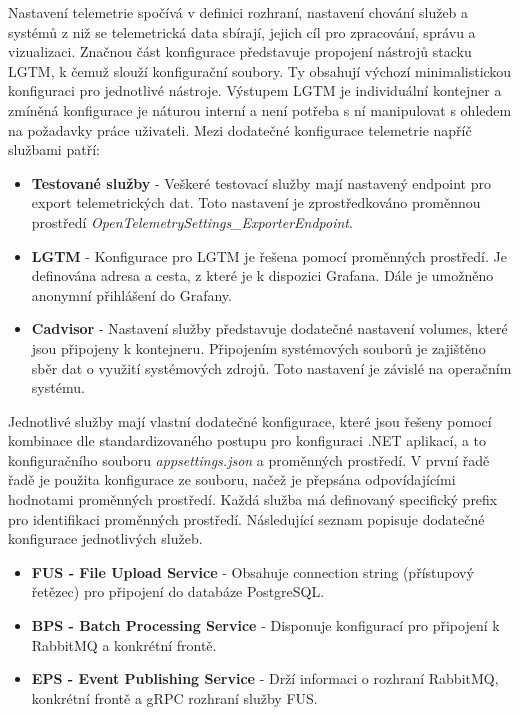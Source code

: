 Nastavení telemetrie spočívá v definici rozhraní, nastavení chování služeb a systémů z niž se telemetrická data sbírají, jejich cíl pro zpracování, správu a vizualizaci. Značnou část konfigurace představuje propojení nástrojů stacku LGTM, k čemuž slouží konfigurační soubory. Ty obsahují výchozí minimalistickou konfiguraci pro jednotlivé nástroje. Výstupem LGTM je individuální kontejner a zmíněná konfigurace je náturou interní a není potřeba s ní manipulovat s ohledem na požadavky práce uživateli. Mezi dodatečné konfigurace telemetrie napříč službami patří:

\begin{itemize}
    \item \textbf{Testované služby} - Veškeré testovací služby mají nastavený endpoint pro export telemetrických dat. Toto nastavení je zprostředkováno proměnnou prostředí \emph{OpenTelemetrySettings\_ExporterEndpoint}.
    \item \textbf{LGTM} - Konfigurace pro LGTM je řešena pomocí proměnných prostředí. Je definována adresa a cesta, z které je k dispozici Grafana. Dále je umožněno anonymní přihlášení do Grafany.
    \item \textbf{Cadvisor} - Nastavení služby představuje dodatečné nastavení volumes, které jsou připojeny k kontejneru. Připojením systémových souborů je zajištěno sběr dat o využití systémových zdrojů. Toto nastavení je závislé na operačním systému.
\end{itemize}

Jednotlivé služby mají vlastní dodatečné konfigurace, které jsou řešeny pomocí kombinace dle standardizovaného postupu pro konfiguraci .NET aplikací, a to konfiguračního souboru \emph{appsettings.json} a proměnných prostředí. V první řadě řadě je použita konfigurace ze souboru, načež je přepsána odpovídajícími hodnotami proměnných prostředí. Každá služba má definovaný specifický prefix pro identifikaci proměnných prostředí. Následující seznam popisuje dodatečné konfigurace jednotlivých služeb.

\begin{itemize}
  \item \textbf{FUS - File Upload Service} - Obsahuje connection string (přístupový řetězec) pro připojení do databáze PostgreSQL.
  \item \textbf{BPS - Batch Processing Service} - Disponuje konfigurací pro připojení k RabbitMQ a konkrétní frontě.
  \item \textbf{EPS - Event Publishing Service} - Drží informaci o rozhraní RabbitMQ, konkrétní frontě a gRPC rozhraní služby FUS.
\end{itemize}

